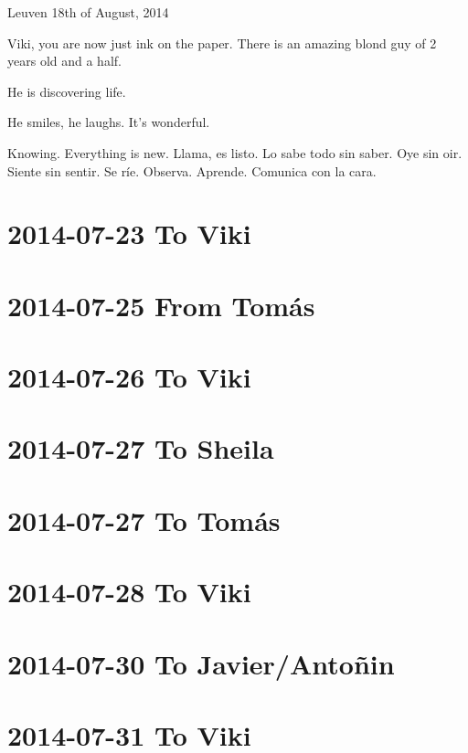\documentclass[]{book}
\begin{document}
Leuven 18th of August, 2014

Viki, you are now just ink on the paper. There is an amazing blond guy of 2 years old and a half.

He is discovering life.

He smiles, he laughs. It's wonderful.

Knowing. Everything is new. Llama, es listo. Lo sabe todo sin saber. Oye sin oir. Siente sin sentir. Se ríe. Observa. Aprende. Comunica con la cara.

\hypertarget{to-viki-3}{%
\section{2014-07-23 To Viki}\label{to-viki-3}}

\hypertarget{from-tomas-6}{%
\section{2014-07-25 From Tomás}\label{from-tomas-6}}

\hypertarget{to-viki-4}{%
\section{2014-07-26 To Viki}\label{to-viki-4}}

\hypertarget{to-sheila-4}{%
\section{2014-07-27 To Sheila}\label{to-sheila-4}}

\hypertarget{to-tomas-10}{%
\section{2014-07-27 To Tomás}\label{to-tomas-10}}

\hypertarget{to-viki-5}{%
\section{2014-07-28 To Viki}\label{to-viki-5}}

\hypertarget{to-javierantonin}{%
\section{2014-07-30 To Javier/Antoñin}\label{to-javierantonin}}

\hypertarget{to-viki-6}{%
\section{2014-07-31 To Viki}\label{to-viki-6}}
\end{document}
